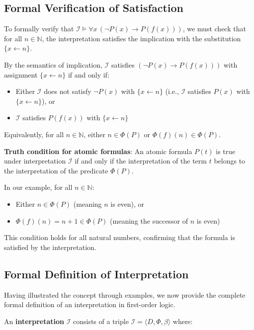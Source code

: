 \documentclass[11pt,a4paper]{article}
\theoremstyle{definition}
\theoremstyle{plain}
\theoremstyle{remark}
\newcommand{\N}{\mathbb{N}}
\begin{document}
\subsection{Formal Verification of Satisfaction}

To formally verify that $\mathcal{I} \models \forall x \, (\neg P(x) \rightarrow P(f(x)))$, we must check that for all $n \in \N$, the interpretation satisfies the implication with the substitution $\{x \leftarrow n\}$.

By the semantics of implication, $\mathcal{I}$ satisfies $(\neg P(x) \rightarrow P(f(x)))$ with assignment $\{x \leftarrow n\}$ if and only if:
\begin{itemize}
    \item Either $\mathcal{I}$ does not satisfy $\neg P(x)$ with $\{x \leftarrow n\}$ (i.e., $\mathcal{I}$ satisfies $P(x)$ with $\{x \leftarrow n\}$), or
    \item $\mathcal{I}$ satisfies $P(f(x))$ with $\{x \leftarrow n\}$
\end{itemize}

Equivalently, for all $n \in \N$, either $n \in \Phi(P)$ or $\Phi(f)(n) \in \Phi(P)$.

\textbf{Truth condition for atomic formulas}: An atomic formula $P(t)$ is true under interpretation $\mathcal{I}$ if and only if the interpretation of the term $t$ belongs to the interpretation of the predicate $\Phi(P)$.

In our example, for all $n \in \N$:
\begin{itemize}
    \item Either $n \in \Phi(P)$ (meaning $n$ is even), or
    \item $\Phi(f)(n) = n + 1 \in \Phi(P)$ (meaning the successor of $n$ is even)
\end{itemize}

This condition holds for all natural numbers, confirming that the formula is satisfied by the interpretation.

\subsection{Formal Definition of Interpretation}

Having illustrated the concept through examples, we now provide the complete formal definition of an interpretation in first-order logic.

An \textbf{interpretation} $\mathcal{I}$ consists of a triple $\mathcal{I} = \langle D, \Phi, \beta \rangle$ where:
\end{document}
